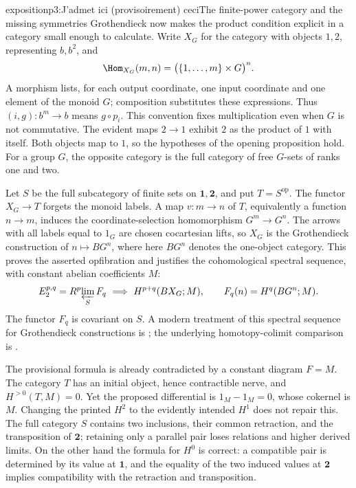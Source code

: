 \begin{dcomment}{exposition}{p3:J'admet ici (provisoirement) ceci}{The finite-power category and the missing symmetries}
Grothendieck now makes the product condition explicit in a category small enough to calculate. Write $X_G$ for the category with objects $1,2$, representing $b,b^2$, and
\[
 \Hom_{X_G}(m,n)=\bigl(\{1,\ldots,m\}\times G\bigr)^n.
\]
A morphism lists, for each output coordinate, one input coordinate and one element of the monoid $G$; composition substitutes these expressions. Thus $(i,g):b^m\to b$ means $g\circ p_i$. This convention fixes multiplication even when $G$ is not commutative. The evident maps $2\to1$ exhibit $2$ as the product of $1$ with itself. Both objects map to $1$, so the hypotheses of the opening proposition hold. For a group $G$, the opposite category is the full category of free $G$-sets of ranks one and two.

Let $S$ be the full subcategory of finite sets on $\mathbf1,\mathbf2$, and put $T=S^{\mathrm{op}}$. The functor $X_G\to T$ forgets the monoid labels. A map $v:m\to n$ of $T$, equivalently a function $n\to m$, induces the coordinate-selection homomorphism $G^m\to G^n$. The arrows with all labels equal to $1_G$ are chosen cocartesian lifts, so $X_G$ is the Grothendieck construction of $n\mapsto BG^n$, where here $BG^n$ denotes the one-object category. This proves the asserted opfibration and justifies the cohomological spectral sequence, with constant abelian coefficients $M$:
\[
 E_2^{p,q}=R^p\!\varprojlim_{S} F_q
 \ \Longrightarrow\ H^{p+q}(BX_G;M),
 \qquad F_q(n)=H^q(BG^n;M).
\]
The functor $F_q$ is covariant on $S$. A modern treatment of this spectral sequence for Grothendieck constructions is \citet[Corollaries 3--4]{Cegarra2020}; the underlying homotopy-colimit comparison is \citet[Theorem 1.2]{Thomason1979}.

The provisional formula is already contradicted by a constant diagram $F=M$. The category $T$ has an initial object, hence contractible nerve, and $H^{>0}(T,M)=0$. Yet the proposed differential is $1_M-1_M=0$, whose cokernel is $M$. Changing the printed $H^2$ to the evidently intended $H^1$ does not repair this. The full category $S$ contains two inclusions, their common retraction, and the transposition of $\mathbf2$; retaining only a parallel pair loses relations and higher derived limits. On the other hand the formula for $H^0$ is correct: a compatible pair is determined by its value at $\mathbf1$, and the equality of the two induced values at $\mathbf2$ implies compatibility with the retraction and transposition.
\end{dcomment}

